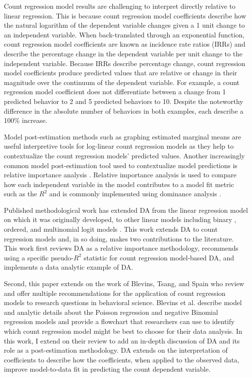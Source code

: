 \documentclass[man]{apa7}
\begin{document}
	Count regression model results are challenging to interpret directly relative to linear regression.
	This is because count regression model coefficients describe how the natural logarithm of the dependent variable changes given a 1 unit change to an independent variable. 
	When back-translated through an exponential function, count regression model coefficients are known as incidence rate ratios (IRRs) and describe the percentage change in the dependent variable per unit change to the independent variable.
	Because IRRs describe percentage change, count regression model coefficients produce predicted values that are relative or change in their magnitude over the continuum of the dependent variable.
	For example, a count regression model coefficient does not differentiate between a change from 1 predicted behavior to 2 and 5 predicted behaviors to 10. 
	Despite the noteworthy difference in the absolute number of behaviors in both examples, each describe a 100\% increase.
		
	Model post-estimation methods such as graphing estimated marginal means are useful interpretive tools for log-linear count regression models as they help to contextualize the count regression models' predicted values.
	Another increasingly common model post-estimation tool used to contextualize model predictions is relative importance analysis \parencite{tonidandel2011relative}. 
	Relative importance analysis is used to compare how each independent variable in the model contributes to a model fit metric such as the $R^2$ and is commonly implemented using dominance analysis \parencite[DA;][]{azen2003dominance}.

	Published methodological work has extended DA from the linear regression model on which it was originally developed, to other linear models including binary \parencite{azen2009using}, ordered, and multinomial logit models \parencite{luchman2014relative}.	
	This work extends DA to count regression models and, in so doing, makes two contributions to the literature.
	This work first reviews DA as a relative importance methodology, recommends using a specific pseudo-$R^2$ statistic for count regression model-based DA, and implements a data analytic example of DA.

	Second, this paper extends on the work of Blevins, Tsang, and Spain \parencite*{blevins2015count} who review and offer multiple recommendations for the application of count regression models to research questions in behavioral science. 
	Blevins et al. describe model and analytic details about the Poisson regression and negative Binomial regression models and provide a flowchart that researchers can use to identify which count regression model might be best to choose for their data analysis.
	In this work, I extend on their review to add an in-depth discussion of DA and its role as a post-estimation methodology.
	DA extends on the interpretation of coefficients to describe how the coefficients, when applied to the observed data, improve model-to-data fit in predicting the count dependent variable.
\end{document}
